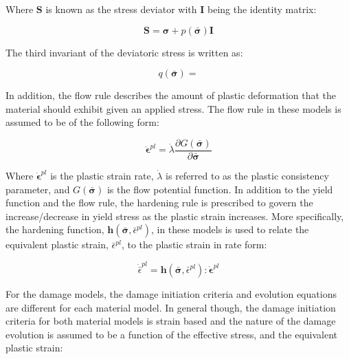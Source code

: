 Where $\mathbf{S}$ is known as the stress deviator with $\mathbf{I}$ being the identity matrix:

\begin{equation}
\mathbf{S}=\boldsymbol{\sigma}+p\left(\bar{\boldsymbol{\sigma}}\right)\mathbf{I}
\label{eqn:gen4}
\end{equation}

The third invariant of the deviatoric stress is written as:

\begin{equation}
q\left(\bar{\boldsymbol{\sigma}}\right)=
\label{eqn:gen5}
\end{equation}

In addition, the flow rule describes the amount of plastic deformation that the material should exhibit given an applied stress. The flow rule in these models is assumed to be of the following form:

\begin{equation}
\dot{\boldsymbol{\epsilon}}^{pl}=\dot{\lambda} \frac{\partial G\left(\bar{\boldsymbol{\sigma}}\right)}{\partial \bar{\boldsymbol{\sigma}}}
\label{eqn:gen6}
\end{equation}

Where $\dot{\boldsymbol{\epsilon}}^{pl}$ is the plastic strain rate, $\dot{\lambda}$ is referred to as the plastic consistency parameter, and $G\left(\bar{\boldsymbol{\sigma}}\right)$ is the flow potential function. In addition to the yield function and the flow rule, the hardening rule is prescribed to govern the increase/decrease in yield stress as the plastic strain increases. More specifically, the hardening function, $\boldsymbol{h}\left(\bar{\boldsymbol{\sigma}}, \bar{\epsilon}^{pl}\right)$, in these models is used to relate the equivalent plastic strain, $\bar{\epsilon}^{pl}$,  to the plastic strain in rate form: 

\begin{equation}
    \dot{\bar{\epsilon}}^{pl}  = 
    \boldsymbol{h}\left(\bar{\boldsymbol{\sigma}}, \bar{\epsilon}^{pl}\right):
    \dot{\boldsymbol{\epsilon}}^{pl}
\label{eqn:gen7}
\end{equation}

For the damage models, the damage initiation criteria and evolution equations are different for each material model. In general though, the damage initiation criteria for both material models is strain based and the nature of the damage evolution is assumed to be a function of the effective stress, and the equivalent plastic strain:

